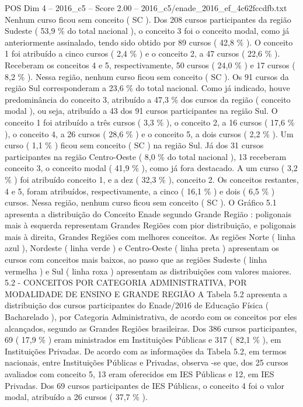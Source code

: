 \begin{textsample}{POS Dim 4 – 2016\_c5 – Score 2.00 – 2016\_c5/enade\_2016\_ef\_4c62fccdfb.txt}
Nenhum curso ficou sem conceito ( SC ).
Dos 208 cursos participantes da região Sudeste ( 53,9 \% do total nacional ), o conceito 3 foi o conceito modal, como já anteriormente assinalado, tendo sido obtido por 89 cursos ( 42,8 \% ).
O conceito 1 foi atribuído a cinco cursos ( 2,4 \% ) e o conceito 2, a 47 cursos ( 22,6 \% ).
Receberam os conceitos 4 e 5, respectivamente, 50 cursos ( 24,0 \% ) e 17 cursos ( 8,2 \% ).
Nessa região, nenhum curso ficou sem conceito ( SC ).
Os 91 cursos da região Sul corresponderam a 23,6 \% do total nacional.
Como já indicado, houve predominância do conceito 3, atribuído a 47,3 \% dos cursos da região ( conceito modal ), ou seja, atribuído a 43 dos 91 cursos participantes na região Sul.
O conceito 1 foi atribuído a três cursos ( 3,3 \% ), o conceito 2, a 16 cursos ( 17,6 \% ), o conceito 4, a 26 cursos ( 28,6 \% ) e o conceito 5, a dois cursos ( 2,2 \% ).
Um curso ( 1,1 \% ) ficou sem conceito ( SC ) na região Sul.
Já dos 31 cursos participantes na região Centro-Oeste ( 8,0 \% do total nacional ), 13 receberam conceito 3, o conceito modal ( 41,9 \% ), como já fora destacado.
A um curso ( 3,2 \% ) foi atribuído conceito 1, e a dez ( 32,3 \% ), conceito 2.
Os conceitos restantes, 4 e 5, foram atribuídos, respectivamente, a cinco ( 16,1 \% ) e dois ( 6,5 \% ) cursos.
Nessa região, nenhum curso ficou sem conceito ( SC ).
O Gráfico 5.1 apresenta a distribuição do Conceito Enade segundo Grande Região : poligonais mais à esquerda representam Grandes Regiões com pior distribuição, e poligonais mais à direita, Grandes Regiões com melhores conceitos.
As regiões Norte ( linha azul ), Nordeste ( linha verde ) e Centro-Oeste ( linha preta ) apresentam os cursos com conceitos mais baixos, ao passo que as regiões Sudeste ( linha vermelha ) e Sul ( linha roxa ) apresentam as distribuições com valores maiores. 5.2 - CONCEITOS POR CATEGORIA ADMINISTRATIVA, POR MODALIDADE DE ENSINO E GRANDE REGIÃO A Tabela 5.2 apresenta a distribuição dos cursos participantes do Enade/2016 de Educação Física ( Bacharelado ), por Categoria Administrativa, de acordo com os conceitos por eles alcançados, segundo as Grandes Regiões brasileiras.
Dos 386 cursos participantes, 69 ( 17,9 \% ) eram ministrados em Instituições Públicas e 317 ( 82,1 \% ), em Instituições Privadas.
De acordo com as informações da Tabela 5.2, em termos nacionais, entre Instituições Públicas e Privadas, observa -se que, dos 25 cursos avaliados com conceito 5, 13 eram oferecidos em IES Públicas e 12, em IES Privadas.
Dos 69 cursos participantes de IES Públicas, o conceito 4 foi o valor modal, atribuído a 26 cursos ( 37,7 \% ).

\end{textsample}
